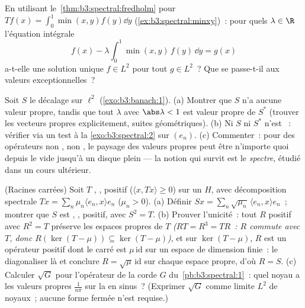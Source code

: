 \begin{exercise}[$\star\star$]\label{exo:b3:spectral:9}
En utilisant le~\cref{thm:b3:spectral:fredholm} pour $Tf(x) =
\int_0^1\min(x,y)f(y)\dd y$ (\cref{ex:b3:spectral:minxy})~:
pour quels $\lambda \in \R$ l'équation intégrale
\[
f(x) - \lambda\int_0^1\min(x,y)\,f(y)\,\dd y = g(x)
\]
a-t-elle une solution unique $f \in L^2$ pour tout $g \in
L^2$~? Que se passe-t-il aux valeurs exceptionnelles~?
\end{exercise}

\begin{exercise}[$\star\star\star$]\label{exo:b3:spectral:10}
Soit $S$ le décalage sur $\ell^2$
(\cref{exo:b3:banach:1}).
(a) Montrer que $S$ n'a aucune valeur propre, tandis que tout
$\lambda$ avec $\abs\lambda < 1$ est valeur propre de $S^*$
(trouver les vecteurs propres explicitement, suites
géométriques).
(b) Ni $S$ ni $S^*$ n'est ~: vérifier via un test à la
\cref{exo:b3:spectral:2} sur $(e_n)$.
(c) Commenter~: pour des opérateurs non , non
, le paysage des valeurs propres peut être n'importe
quoi depuis le vide jusqu'à un disque plein --- la notion qui
survit est le \emph{spectre}, étudié dans un cours ultérieur.
\end{exercise}

\begin{exercise}[$\star\star$]\label{exo:b3:spectral:11}
(Racines carrées) Soit $T$ , , positif
($\langle x, Tx\rangle \geq 0$) sur un  $H$,
avec décomposition spectrale $Tx = \sum_n\mu_n\langle e_n,
x\rangle e_n$ ($\mu_n > 0$).
(a) Définir $Sx = \sum_n\sqrt{\mu_n}\,\langle e_n, x\rangle
e_n$~; montrer que $S$ est , , positif, avec
$S^2 = T$.
(b) Prouver l'unicité~: tout $R$  positif 
avec $R^2 = T$ préserve les espaces propres de $T$
\emph{($RT = R^3 = TR$~: $R$ commute avec $T$, donc
$R(\ker(T - \mu)) \subseteq \ker(T - \mu)$)}, et sur
$\ker(T - \mu)$, $R$ est un opérateur positif dont le carré
est $\mu\,\mathrm{id}$ sur un espace de dimension finie~: le
diagonaliser là et conclure $R = \sqrt\mu\,\mathrm{id}$ sur
chaque espace propre, d'où $R = S$.
(c) Calculer $\sqrt G$ pour l'opérateur de la corde $G$ du~\cref{pb:b3:spectral:1}~: quel noyau a les valeurs propres
$\frac1{n\pi}$ sur la  en sinus~? (Exprimer $\sqrt G$
comme limite $L^2$ de noyaux~; aucune forme fermée n'est
requise.)
\end{exercise}

